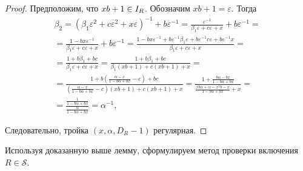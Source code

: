 \documentclass[_00_dissertation.tex]{subfiles}
\begin{document}
\begin{proof}
    Предположим, что $xb + 1 \in I_{R}$.
    Обозначим $xb + 1 = \varepsilon$.
    Тогда
    \begin{equation*}
        \begin{split}
            \beta_2 = \left(
                \beta_1 \varepsilon^2 + c\varepsilon^2 + x\varepsilon
            \right)^{-1} + b\varepsilon^{-1} = \frac{
                \varepsilon^{-1}
            }{
                \beta_1 \varepsilon + c\varepsilon + x
            } + b\varepsilon^{-1} = \\
            = \frac{
                1 - bx\varepsilon^{-1}
            }{
                \beta_1 \varepsilon + c\varepsilon + x
            } + b\varepsilon^{-1} = \frac{
                1 - bx\varepsilon^{-1} + b\varepsilon^{-1}\beta_1 \varepsilon + b\varepsilon^{-1}c\varepsilon + b\varepsilon^{-1}x
            }{
                \beta_1 \varepsilon + c\varepsilon + x
            } = \\
            = \frac{
                1 + b\beta_1 + bc
            }{
                \beta_1 \varepsilon + c\varepsilon + x
            } = \frac{
                1 + b\beta_1 + bc
            }{
                \beta_1(xb + 1) + c(xb + 1) + x
            } = \\
            = \frac{
                1 + b\left(
                    \frac{\alpha - x}{1 - b\alpha + bx} - c
                \right) + bc
            }{
                \left(
                    \frac{\alpha - x}{1 - b\alpha + bx} - c
                \right)(xb + 1) + c(xb + 1) + x
            } = \frac{
                1 + \frac{b\alpha - bx}{1 - b\alpha + bx}
            }{
                \frac{xb\alpha + \alpha - x^2b - x}{1 - b\alpha + bx} + x
            } = \\
            = \frac{
                \frac{1}{1 - b\alpha + bx}
            }{
                \frac{\alpha}{1 - b\alpha + bx}
            } = \alpha^{-1},
        \end{split}
    \end{equation*}
    
    Следовательно, тройка $(x, \alpha, D_R - 1)$ регулярная.
\end{proof}

Используя доказанную выше лемму, сформулируем метод проверки включения $R \in \mathcal{S}$.
\end{document}
